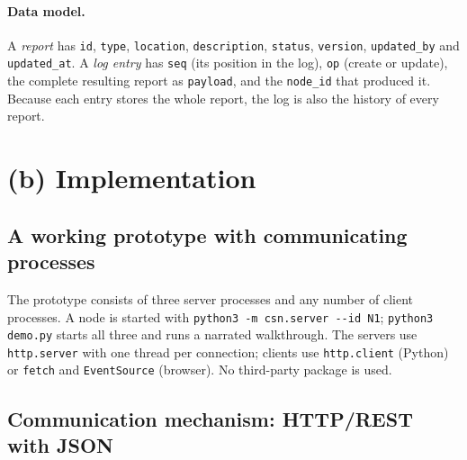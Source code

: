 \documentclass[10pt,a4paper]{article}
\newcommand{\code}[1]{\texttt{#1}}
\begin{document}
\paragraph{Data model.} A \emph{report} has \code{id}, \code{type}, \code{location},
\code{description}, \code{status}, \code{version}, \code{updated\_by} and \code{updated\_at}. A
\emph{log entry} has \code{seq} (its position in the log), \code{op} (create or update), the
complete resulting report as \code{payload}, and the \code{node\_id} that produced it. Because
each entry stores the whole report, the log is also the history of every report.

\section{(b) Implementation}

\subsection{A working prototype with communicating processes}

The prototype consists of three server processes and any number of client processes. A node is
started with \code{python3 -m csn.server -{}-id N1}; \code{python3 demo.py} starts all three and
runs a narrated walkthrough. The servers use \code{http.server} with one thread per connection;
clients use \code{http.client} (Python) or \code{fetch} and \code{EventSource} (browser). No
third-party package is used.

\subsection{Communication mechanism: HTTP/REST with JSON}
\end{document}
